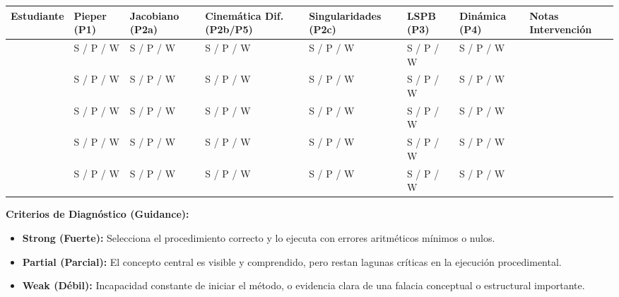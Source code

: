 \documentclass[11pt, a4paper, landscape]{article}
\begin{document}
\vspace{0.4cm}
{\small
\renewcommand{\arraystretch}{1.5}
\noindent
\begin{tabularx}{\textwidth}{|>{\hsize=1.2\hsize\raggedright\arraybackslash}X|>{\hsize=0.8\hsize\centering\arraybackslash}X|>{\hsize=0.8\hsize\centering\arraybackslash}X|>{\hsize=0.8\hsize\centering\arraybackslash}X|>{\hsize=0.8\hsize\centering\arraybackslash}X|>{\hsize=0.8\hsize\centering\arraybackslash}X|>{\hsize=0.8\hsize\centering\arraybackslash}X|>{\hsize=1\hsize\raggedright\arraybackslash}X|}
\hline
\rowcolor{gray!20} \textbf{Estudiante} & \textbf{Pieper} (P1) & \textbf{Jacobiano} (P2a) & \textbf{Cinemática Dif.} (P2b/P5) & \textbf{Singularidades} (P2c) & \textbf{LSPB} (P3) & \textbf{Dinámica} (P4) & \textbf{Notas Intervención} \\ \hline
& S / P / W & S / P / W & S / P / W & S / P / W & S / P / W & S / P / W & \\ \hline
& S / P / W & S / P / W & S / P / W & S / P / W & S / P / W & S / P / W & \\ \hline
& S / P / W & S / P / W & S / P / W & S / P / W & S / P / W & S / P / W & \\ \hline
& S / P / W & S / P / W & S / P / W & S / P / W & S / P / W & S / P / W & \\ \hline
& S / P / W & S / P / W & S / P / W & S / P / W & S / P / W & S / P / W & \\ \hline
\end{tabularx}
}

\vspace{0.6cm}
\textbf{Criterios de Diagnóstico (Guidance):}
\begin{itemize}
    \item \textbf{Strong (Fuerte):} Selecciona el procedimiento correcto y lo ejecuta con errores aritméticos mínimos o nulos.
    \item \textbf{Partial (Parcial):} El concepto central es visible y comprendido, pero restan lagunas críticas en la ejecución procedimental.
    \item \textbf{Weak (Débil):} Incapacidad constante de iniciar el método, o evidencia clara de una falacia conceptual o estructural importante.
\end{itemize}
\end{document}

